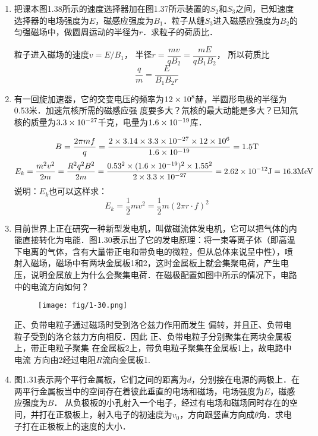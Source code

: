 \begin{enumerate}
\item 把课本图1.38所示的速度选择器加在图1.37所示装置的$S_2$和$S_3$之间，已知速度选择器的电场强度为$E$，磁感应强度为$B_1$．粒子从缝$S_3$进入磁感应强度为$B_2$的匀强磁场中，做圆周运动的半径为$r$．求粒子的荷质比．

\begin{solution}
    粒子进入磁场的速度$v=E/B_1$，
    半径$r=\dfrac{mv}{qB_2}=\dfrac{mE}{qB_1B_2}$，
    所以荷质比
\[\frac{q}{m}=\frac{E}{B_1B_2 r}\]
\end{solution}

\item  有一回旋加速器，它的交变电压的频率为$12\times10^8$赫，半圆形电极的半径为0.53米．加速氘核所需的磁感应强
度要多大？氘核的最大动能是多大？已知氘核的质量为$3.3\times10^{-27}$千克，电量为$1.6\times10^{-19}$库．


\begin{solution}
\[B=\frac{2\pi mf}{q}=\frac{2\times 3.14\times 3.3\times 10^{-27}\times 12\times 10^6}{1.6\times 10^{-19}}=1.5{\rm T}\]
\[E_k=\frac{m^2v^2}{2m}=\frac{R^2q^2B^2}{2m}=\frac{0.53^2\times (1.6\times 10^{-19})^2\times 1.55^2}{2\times 3.3\times 10^{-27}}=2.62\times 10^{-12}{\rm J}=16.3{\rm MeV}\]
说明：$E_k$也可以这样求：
\[E_k=\frac{1}{2}mv^2=\frac{1}{2}m(2\pi r\cdot f)^2\]
\end{solution}

\item 目前世界上正在研究一种新型发电机，叫做磁流体发电机，它可以把气体的内能直接转化为电能．图1.30表示出了它的发电原理：将一束等离子体（即高温下电离的气体，含有大量带正电和带负电的微粒，但从总体来说呈中性），喷射入磁场，磁场中有两块金属板1和2，这时金属板上就会集聚电荷，产生电压，说明金属放上为什么会聚集电荷．在磁极配置如图中所示的情况下，电路中的电流方向如何？

\begin{figure}[htp]
    \centering
\texttt{[image: fig/1-30.png]}
    \caption{}
\end{figure}

\begin{solution}
    正、负带电粒子通过磁场时受到洛仑兹力作用而发生
    偏转，并且正、负带电粒子受到的洛仑兹力方向相反．因此
    正、负带电粒子分别聚集在两块金属板上，带正电粒子聚集
    在金属板2上，带负电粒子聚集在金属板1上，故电路中电流
    方向由2经过电阻$R$流向金属板1.
\end{solution}

\item  图1.31表示两个平行金属板，它们之间的距离为$d$，分别接在电源的两极上．在两平行金属板当中的空间存在着彼此垂直的电场和磁场，电场强度为$E$，磁感应强度为$B$． 从负极板的小孔射入一个电子，经过有电场和磁场同时存在的空间，并打在正极板上，射入电子的初速度为$v_0$，方向跟竖直方向成$\theta$角．求电子打在正极板上的速度的大小．


\end{enumerate}

